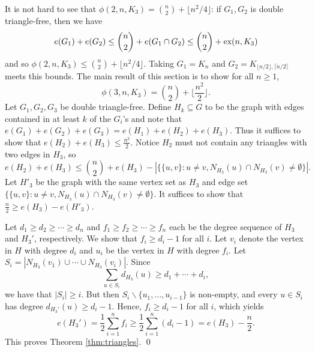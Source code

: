 \documentclass[12pt]{article}
\newcommand*{\ex}{\textnormal{ex}}
\begin{document}
It is not hard to see that $\phi(2,n,K_3) = \binom{n}{2} + \lfloor n^2/4\rfloor$: if $G_1,G_2$ 
is double triangle-free, then we have
\[
	e(G_1) + e(G_2) \leq \binom{n}{2} + e(G_1 \cap G_2) \leq \binom{n}{2} + \ex(n, K_3)
\]
and so $\phi(2,n,K_3) \leq \binom{n}{2} + \lfloor n^2/4\rfloor$. Taking $G_1 = K_n$ and $G_2 = K_{\lfloor n/2 \rfloor,\lceil n/2 \rceil}$ meets this bounds. The main result of this section is to show
for all $n \geq 1$, 
\[    \phi(3, n, K_3) = \binom{n}{2} + \Big\lfloor \frac{n^2}{2} \Big\rfloor.\]
Let $G_1,G_2,G_3$ be double triangle-free. 
  Define $H_k \subseteq G$ to be the graph with edges contained in at least $k$  of the $G_i$'s and note that $e(G_1) + e(G_2) + e(G_3) = e(H_1) + e(H_2) + e(H_3)$. Thus it suffices to show that $e(H_2) + e(H_3) \leq \frac{n^2}{2}$. Notice $H_2$ must not contain any triangles with two edges in $H_3$, so
  \[
    e(H_2) + e(H_3) \leq \binom{n}{2} + e(H_3) - |\{\{u, v\} : u \neq v, N_{H_3}(u) \cap N_{H_3}(v) \neq \emptyset\}|.
  \]
  Let $H'_3$ be the graph with the same vertex set as $H_3$ and edge set $\{\{u, v\} : u \neq v, N_{H_3}(u) \cap N_{H_3}(v) \neq \emptyset\}$. It suffices to show that $\frac{n}{2} \geq e(H_3) - e(H'_3)$. 

  Let $d_1 \geq d_2 \geq \cdots \geq d_n$ and $f_1 \geq f_2 \geq \cdots \geq f_n$ each be the degree sequence of $H_3$ and $H_3'$, respectively. We show that $f_i \geq d_i - 1$ for all $i$. Let $v_i$ denote the vertex in $H$ with degree $d_i$ and $u_i$ be the vertex in $H$ with degree $f_i$. Let $S_i = |N_{H_3}(v_1) \cup \cdots \cup N_{H_3}(v_i)|$. Since 
  \[
    \sum_{u \in S_i} d_{H_3}(u) \geq d_1 + \cdots + d_i,
  \]
  we have that $|S_i| \geq i$. But then $S_i \backslash \{u_1, \ldots, u_{i - 1}\}$ is non-empty, and every $u \in S_i$ has degree $d_{H_3'}(u) \geq d_i - 1$. Hence, $f_i \geq d_i - 1$ for all $i$, which yields
  \[
    e(H_3') = \frac{1}{2}\sum_{i = 1}^n f_i \geq \frac{1}{2}\sum_{i = 1}^n (d_i - 1) = e(H_3) - \frac{n}{2}.
  \]
  This proves Theorem \ref{thm:triangles}. \qed




\end{document}
